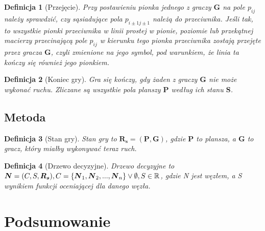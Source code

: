 \documentclass[12pt, a4paper]{article}
\newtheorem{definition}{Definicja}
\begin{document}
\begin{definition}[Przejęcie]
    Przy postawieniu pionka jednego z graczy $\boldsymbol{G}$ na pole $p_{ij}$ należy sprawdzić, czy sąsiadujące pola
    $p_{i \pm 1 j \pm 1}$ należą do przeciwnika. Jeśli tak, to wszystkie pionki przeciwnika w linii prostej w
    pionie, poziomie lub przekątnej macierzy przecinającą pole $p_{ij}$ w kierunku tego pionka przeciwnika zostają przejęte
    przez gracza $\boldsymbol{G}$, czyli zmienione na jego symbol, pod warunkiem, że linia ta kończy się również jego pionkiem.
\end{definition}

\begin{definition}[Koniec gry]
    Gra się kończy, gdy żaden z graczy $\boldsymbol{G}$ nie może wykonać ruchu.
    Zliczane są wszystkie pola planszy $\boldsymbol{P}$ według ich stanu $\boldsymbol{S}$.
\end{definition}

\subsection{Metoda}

\begin{definition}[Stan gry]
    Stan gry to $\boldsymbol{R_{s}} = (\boldsymbol{P}, \boldsymbol{G})$, gdzie $\boldsymbol{P}$ to plansza, a $\boldsymbol{G}$ to gracz,
    który miałby wykonywać teraz ruch. 
\end{definition}

\begin{definition}[Drzewo decyzyjne]
    Drzewo decyzyjne to $\boldsymbol{N} = (C, S, \boldsymbol{R_s}), \\
    C = \{\boldsymbol{N}_1, \boldsymbol{N}_2, ...,  \boldsymbol{N}_n\} \lor \emptyset,
    S \in \mathbb{R} $, gdzie N jest węzłem, a S wynikiem funkcji oceniającej dla danego węzła.
\end{definition}

\section{Podsumowanie}
\end{document}
